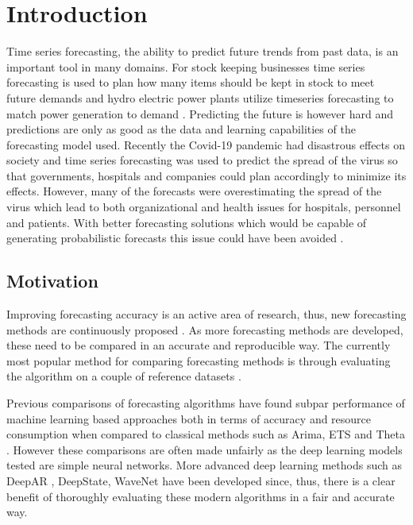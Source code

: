 \chapter{Introduction\label{cha:chapter1}}
Time series forecasting, the ability to predict future trends from past data, is an important tool in many domains. For stock keeping businesses time series forecasting is used to plan how many items should be kept in stock to meet future demands and hydro electric power plants utilize timeseries forecasting to match power generation to demand \cite{rangapuram_deep_2018, pena2009capacity}. Predicting the future is however hard and predictions are only as good as the data and learning capabilities of the forecasting model used. Recently the Covid-19 pandemic had disastrous effects on society and time series forecasting was used to predict the spread of the virus so that governments, hospitals and companies could plan accordingly to minimize its effects. However, many of the forecasts were overestimating the spread of the virus which lead to both organizational and health issues for hospitals, personnel and patients. With better forecasting solutions which would be capable of generating probabilistic forecasts this issue could have been avoided \cite{IOANNIDIS2020}.

\section{Motivation}
Improving forecasting accuracy is an active area of research, thus, new forecasting methods are continuously proposed \cite{salinas_deepar_2019,rangapuram_deep_2018,oord_wavenet_2016,oreshkin_n_beats_2020,salinas_high-dimensional_2019}. As more forecasting methods are developed, these need to be compared in an accurate and reproducible way. The currently most popular method for comparing forecasting methods is through evaluating the algorithm on a couple of reference datasets \cite{hyndman_forecasting_3rd}.

Previous comparisons of forecasting algorithms have found subpar performance of machine learning based approaches both in terms of accuracy and resource consumption when compared to classical methods such as Arima, ETS and Theta \cite{m3_competition,makridakis_m4_2020,other_thesis}. However these comparisons are often made unfairly as the deep learning models tested are simple neural networks. More advanced deep learning methods such as DeepAR \cite{salinas_deepar_2019}, DeepState\cite{rangapuram_deep_2018}, WaveNet \cite{oord_wavenet_2016} have been developed since, thus, there is a clear benefit of thoroughly evaluating these modern algorithms in a fair and accurate way.


